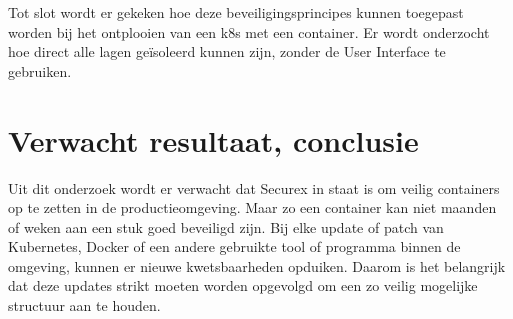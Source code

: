 Tot slot wordt er gekeken hoe deze beveiligingsprincipes kunnen toegepast worden bij het ontplooien van een k8s met een container. Er wordt onderzocht hoe direct alle lagen geïsoleerd kunnen zijn, zonder de User Interface te gebruiken.

\section{Verwacht resultaat, conclusie}%
\label{sec:verwachte_resultaten}

Uit dit onderzoek wordt er verwacht dat Securex in staat is om veilig containers op te zetten in de productieomgeving. Maar zo een container kan niet maanden of weken aan een stuk goed beveiligd zijn. Bij elke update of patch van Kubernetes, Docker of een andere gebruikte tool of programma binnen de omgeving, kunnen er nieuwe kwetsbaarheden opduiken. Daarom is het belangrijk dat deze updates strikt moeten worden opgevolgd om een zo veilig mogelijke structuur aan te houden.

